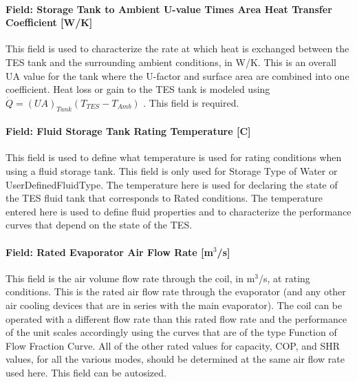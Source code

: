 \paragraph{Field: Storage Tank to Ambient U-value Times Area Heat Transfer Coefficient {[}W/K{]}}\label{field-storage-tank-to-ambient-u-value-times-area-heat-transfer-coefficient-wk}

This field is used to characterize the rate at which heat is exchanged between the TES tank and the surrounding ambient conditions, in W/K. This is an overall UA value for the tank where the U-factor and surface area are combined into one coefficient. Heat loss or gain to the TES tank is modeled using \(\dot Q = {\left( {UA} \right)_{Tank}}\left( {{T_{TES}} - {T_{Amb}}} \right)\) . This field is required.

\paragraph{Field: Fluid Storage Tank Rating Temperature {[}C{]}}\label{field-fluid-storage-tank-rating-temperature-c}

This field is used to define what temperature is used for rating conditions when using a fluid storage tank. This field is only used for Storage Type of Water or UserDefinedFluidType. The temperature here is used for declaring the state of the TES fluid tank that corresponds to Rated conditions. The temperature entered here is used to define fluid properties and to characterize the performance curves that depend on the state of the TES.

\paragraph{Field: Rated Evaporator Air Flow Rate {[}m\(^{3}\)/s{]}}\label{field-rated-evaporator-air-flow-rate-m3s}

This field is the air volume flow rate through the coil, in m\(^{3}\)/s, at rating conditions. This is the rated air flow rate through the evaporator (and any other air cooling devices that are in series with the main evaporator). The coil can be operated with a different flow rate than this rated flow rate and the performance of the unit scales accordingly using the curves that are of the type Function of Flow Fraction Curve. All of the other rated values for capacity, COP, and SHR values, for all the various modes, should be determined at the same air flow rate used here. This field can be autosized.

